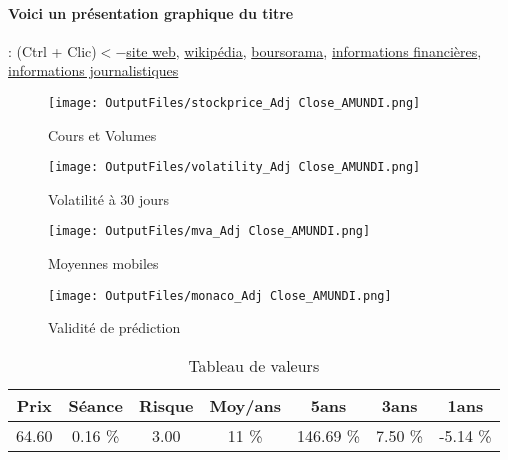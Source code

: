 \documentclass[11pt,a4paper]{report}%
\begin{document}
\paragraph{Voici un présentation graphique du titre} : (Ctrl + Clic)$<-$\href{https://le-groupe.amundi.com/}{site web}, \href{https://fr.wikipedia.org/wiki/Amundi}{wikipédia}, \href{https://www.boursorama.com/cours/1rPAMUN}{boursorama}, \href{https://www.qwant.com/?q=site:https:%2f%2fwww.easybourse.com%2faction-societe%2fAMUNDI&t=web&client=ext-firefox-hp}{informations financières}, \href{https://bourse.lerevenu.com/cours-de-bourse/fiche-valeur-synthese/AMUNDI/AMUN-FR}{informations journalistiques}
\begin{figure}[!htb]
   \begin{minipage}{0.5\textwidth}
     \centering
     \texttt{[image: OutputFiles/stockprice\_Adj Close\_AMUNDI.png]}
     \caption{Cours et Volumes}\label{Fig:price_AMUNDI}
   \end{minipage}\hfill
   \begin{minipage}{0.5\textwidth}
     \centering
     \texttt{[image: OutputFiles/volatility\_Adj Close\_AMUNDI.png]}
     \caption{Volatilité à 30 jours}\label{Fig:volat_AMUNDI}
   \end{minipage}
\end{figure}
\begin{figure}[!htb]
   \begin{minipage}{0.5\textwidth}
     \centering
     \texttt{[image: OutputFiles/mva\_Adj Close\_AMUNDI.png]}
     \caption{Moyennes mobiles}\label{Fig:mva_AMUNDI}
   \end{minipage}\hfill
   \begin{minipage}{0.5\textwidth}
     \centering
     \texttt{[image: OutputFiles/monaco\_Adj Close\_AMUNDI.png]}
     \caption{Validité de prédiction}\label{Fig:prediction_AMUNDI}
   \end{minipage}
\end{figure}

\begin{table}[H]
  \centering
    \begin{tabular}{|c|c|c|c|c|c|c|}
    \hline
    Prix & Séance & Risque  & Moy/ans & 5ans & 3ans & 1ans \\
    \hline
    64.60 &    0.16 \%    & 3.00 & 11 \% & 146.69 \% & 7.50 \% & -5.14 \% \\
    \hline
    \end{tabular}%
        \label{tab:table_AM-5.14DI}%
      \caption{Tableau de valeurs}
\end{table}%
\end{document}
